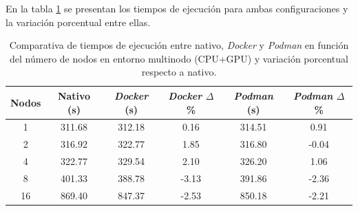 En la tabla \ref{tab:multi-node_ubuntu_container_vs_native_gpu} se presentan los tiempos de ejecución para ambas configuraciones y la variación porcentual entre ellas.

\begin{table}[ht]
    \centering
    \small
    \setlength{\tabcolsep}{4pt}
    \renewcommand{\arraystretch}{1.1}
    \begin{tabular}{|c|c|c|c|c|c|}
        \hline
        \textbf{Nodos} & \textbf{Nativo (s)} & \textbf{\textit{Docker} (s)} & \textbf{\textit{Docker} $\Delta$\%} & \textbf{\textit{Podman} (s)} & \textbf{\textit{Podman} $\Delta$\%} \\
        \hline
        1              & 311.68              & 312.18                       & 0.16                                & 314.51                       & 0.91                                \\
        2              & 316.92              & 322.77                       & 1.85                                & 316.80                       & -0.04                               \\
        4              & 322.77              & 329.54                       & 2.10                                & 326.20                       & 1.06                                \\
        8              & 401.33              & 388.78                       & -3.13                               & 391.86                       & -2.36                               \\
        16             & 869.40              & 847.37                       & -2.53                               & 850.18                       & -2.21                               \\
        \hline
    \end{tabular}
    \caption{Comparativa de tiempos de ejecución entre nativo, \textit{Docker} y \textit{Podman} en función del número de nodos en entorno multinodo (CPU+GPU) y variación porcentual respecto a nativo.}
    \label{tab:multi-node_ubuntu_container_vs_native_gpu}
\end{table}

